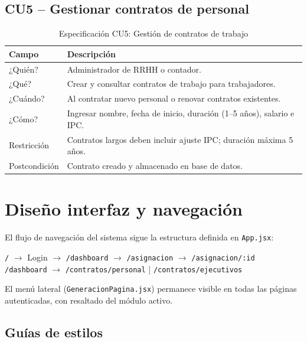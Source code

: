 \documentclass[12pt,a4paper]{report}
\begin{document}
\subsection{CU5 -- Gestionar contratos de personal}

\begin{table}[htbp]
  \centering
  \caption{Especificación CU5: Gestión de contratos de trabajo}
  \begin{tabular}{@{}p{3.5cm}p{10cm}@{}}
    \toprule
    \textbf{Campo} & \textbf{Descripción} \\
    \midrule
    ¿Quién? & Administrador de RRHH o contador. \\
    ¿Qué? & Crear y consultar contratos de trabajo para trabajadores. \\
    ¿Cuándo? & Al contratar nuevo personal o renovar contratos existentes. \\
    ¿Cómo? & Ingresar nombre, fecha de inicio, duración (1--5 años), salario e IPC. \\
    Restricción & Contratos largos deben incluir ajuste IPC; duración máxima 5 años. \\
    Postcondición & Contrato creado y almacenado en base de datos. \\
    \bottomrule
  \end{tabular}
\end{table}

\pagebreak
\section{Diseño interfaz y navegación}

El flujo de navegación del sistema sigue la estructura definida en \texttt{App.jsx}:

\begin{center}
  \texttt{/} $\rightarrow$ Login $\rightarrow$ \texttt{/dashboard} $\rightarrow$ \texttt{/asignacion} $\rightarrow$ \texttt{/asignacion/:id}\\
  \texttt{/dashboard} $\rightarrow$ \texttt{/contratos/personal} \quad | \quad \texttt{/contratos/ejecutivos}
\end{center}

El menú lateral (\texttt{GeneracionPagina.jsx}) permanece visible en todas las páginas autenticadas, con resaltado del módulo activo.

\subsection{Guías de estilos}
\end{document}
